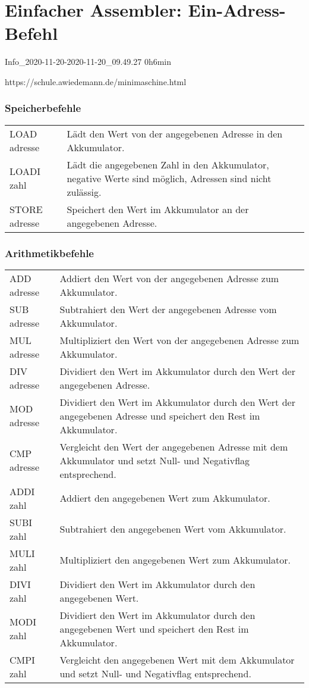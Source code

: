\documentclass{lehramt-informatik-haupt}
\begin{document}

\chapter{Einfacher Assembler: Ein-Adress-Befehl}

Info\_2020-11-20-2020-11-20\_09.49.27 0h6min

https://schule.awiedemann.de/minimaschine.html

\subsection{Speicherbefehle}

\begin{tabularx}{\linewidth}{lX}
LOAD adresse  & Lädt den Wert von der angegebenen Adresse in den Akkumulator. \\
LOADI zahl    & Lädt die angegebenen Zahl in den Akkumulator, negative Werte sind möglich, Adressen sind nicht zulässig. \\
STORE adresse & Speichert den Wert im Akkumulator an der angegebenen Adresse.
\end{tabularx}

\subsection{Arithmetikbefehle}

\begin{tabularx}{\linewidth}{lX}
ADD adresse   & Addiert den Wert von der angegebenen Adresse zum Akkumulator. \\
SUB adresse   & Subtrahiert den Wert der angegebenen Adresse vom Akkumulator. \\
MUL adresse   & Multipliziert den Wert von der angegebenen Adresse zum Akkumulator. \\
DIV adresse   & Dividiert den Wert im Akkumulator durch den Wert der angegebenen Adresse. \\
MOD adresse   & Dividiert den Wert im Akkumulator durch den Wert der angegebenen Adresse und speichert den Rest im Akkumulator. \\
CMP adresse   & Vergleicht den Wert der angegebenen Adresse mit dem Akkumulator und setzt Null- und Negativflag entsprechend. \\
ADDI zahl     & Addiert den angegebenen Wert zum Akkumulator. \\
SUBI zahl     & Subtrahiert den angegebenen Wert vom Akkumulator. \\
MULI zahl     & Multipliziert den angegebenen Wert zum Akkumulator. \\
DIVI zahl     & Dividiert den Wert im Akkumulator durch den angegebenen Wert. \\
MODI zahl     & Dividiert den Wert im Akkumulator durch den angegebenen Wert und speichert den Rest im Akkumulator. \\
CMPI zahl     & Vergleicht den angegebenen Wert mit dem Akkumulator und setzt Null- und Negativflag entsprechend.
\end{tabularx}
\end{document}
